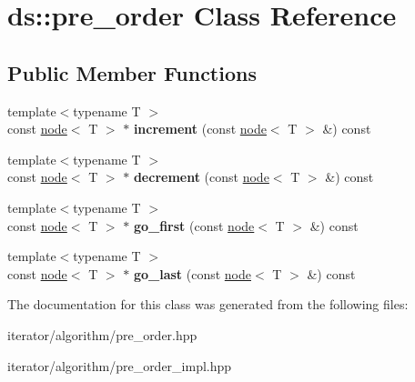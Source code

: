 \hypertarget{classds_1_1pre__order}{}\section{ds\+:\+:pre\+\_\+order Class Reference}
\label{classds_1_1pre__order}
\subsection*{Public Member Functions}
\begin{DoxyCompactItemize}
\item 
{\footnotesize template$<$typename T $>$ }\\const \hyperlink{classds_1_1node}{node}$<$ T $>$ $\ast$ {\bfseries increment} (const \hyperlink{classds_1_1node}{node}$<$ T $>$ \&) const \hypertarget{classds_1_1pre__order_a9d37ce2691c01c921b10f68fe3a1ee74}{}\label{classds_1_1pre__order_a9d37ce2691c01c921b10f68fe3a1ee74}

\item 
{\footnotesize template$<$typename T $>$ }\\const \hyperlink{classds_1_1node}{node}$<$ T $>$ $\ast$ {\bfseries decrement} (const \hyperlink{classds_1_1node}{node}$<$ T $>$ \&) const \hypertarget{classds_1_1pre__order_a8ad7f210652ce03be30ac22b2c4e7e6d}{}\label{classds_1_1pre__order_a8ad7f210652ce03be30ac22b2c4e7e6d}

\item 
{\footnotesize template$<$typename T $>$ }\\const \hyperlink{classds_1_1node}{node}$<$ T $>$ $\ast$ {\bfseries go\+\_\+first} (const \hyperlink{classds_1_1node}{node}$<$ T $>$ \&) const \hypertarget{classds_1_1pre__order_aafce1066e77c41b79874a8097ca677f5}{}\label{classds_1_1pre__order_aafce1066e77c41b79874a8097ca677f5}

\item 
{\footnotesize template$<$typename T $>$ }\\const \hyperlink{classds_1_1node}{node}$<$ T $>$ $\ast$ {\bfseries go\+\_\+last} (const \hyperlink{classds_1_1node}{node}$<$ T $>$ \&) const \hypertarget{classds_1_1pre__order_a47b5298786fc2c1e5ae37534f04148cc}{}\label{classds_1_1pre__order_a47b5298786fc2c1e5ae37534f04148cc}

\end{DoxyCompactItemize}


The documentation for this class was generated from the following files\+:\begin{DoxyCompactItemize}
\item 
iterator/algorithm/pre\+\_\+order.\+hpp\item 
iterator/algorithm/pre\+\_\+order\+\_\+impl.\+hpp\end{DoxyCompactItemize}
